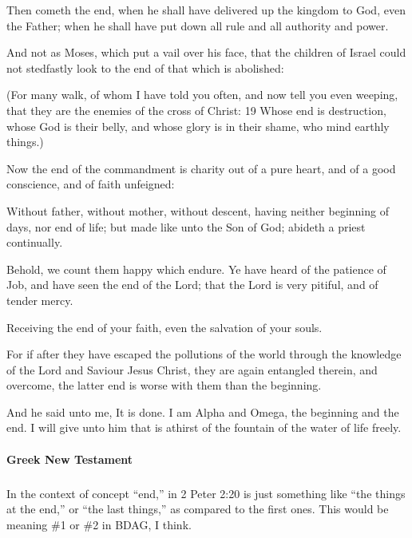\begin{compactdesc}
				\item[1 Corinthians 15:24] Then cometh the end, when he shall have delivered up the kingdom to God, even the Father; when he shall have put down all rule and all authority and power.
				\item[2 Corinthians 3:13] And not as Moses, which put a vail over his face, that the children of Israel could not stedfastly look to the end of that which is abolished:
				\item[Philippians 3:18--19] (For many walk, of whom I have told you often, and now tell you even weeping, that they are the enemies of the cross of Christ: 19 Whose end is destruction, whose God is their belly, and whose glory is in their shame, who mind earthly things.)
				\item[1 Timothy 1:5] Now the end of the commandment is charity out of a pure heart, and of a good conscience, and of faith unfeigned:
				\item[Hebrews 7:3] Without father, without mother, without descent, having neither beginning of days, nor end of life; but made like unto the Son of God; abideth a priest continually.
				\item[James 5:11] Behold, we count them happy which endure. Ye have heard of the patience of Job, and have seen the end of the Lord; that the Lord is very pitiful, and of tender mercy.
				\item[1 Peter 1:9] Receiving the end of your faith, even the salvation of your souls.
				\item[2 Peter 2:20] For if after they have escaped the pollutions of the world through the knowledge of the Lord and Saviour Jesus Christ, they are again entangled therein, and overcome, the latter end is worse with them than the beginning.
				\item[Revelation 21:6] And he said unto me, It is done. I am Alpha and Omega, the beginning and the end. I will give unto him that is athirst of the fountain of the water of life freely.
			\end{compactdesc}
			
		\paragraph{Greek New Testament}
			\label{END-GREEK}
			
			\subparagraph{\texorpdfstring{}{}}
				\label{ESCHATOS}
			
				In the context of concept ``end,'' in 2 Peter 2:20  is just something like ``the things at the end,'' or ``the last things,'' as compared to the first ones. This would be meaning \#1 or \#2 in BDAG, I think.
			
